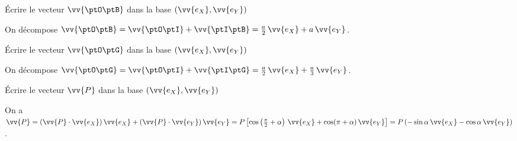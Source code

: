 \debutEntrainement


\begin{enonce}
	Écrire le vecteur $\vv{\ptO\ptB}$ dans la base $(\vv{e_X},\vv{e_Y})$
\end{enonce}


\begin{corrige}
	On décompose $\vv{\ptO\ptB} = \vv{\ptO\ptI} + \vv{\ptI\ptB} = \frac{a}{2}\,\vv{e_X} + a\,\vv{e_Y}$.
\end{corrige}



\begin{enonce}
	Écrire le vecteur $\vv{\ptO\ptG}$ dans la base $(\vv{e_X},\vv{e_Y})$
\end{enonce}


\begin{corrige}
	On décompose $\vv{\ptO\ptG} = \vv{\ptO\ptI} + \vv{\ptI\ptG} = \frac{a}{2}\,\vv{e_X} + \frac{a}{3}\,\vv{e_Y}$.
\end{corrige}



\begin{enonce}
	Écrire le vecteur $\vv{P}$ dans la base $(\vv{e_X},\vv{e_Y})$
\end{enonce}


\begin{corrige}
	On a $\vv{P} = (\vv{P}\cdot\vv{e_X})\,\vv{e_X}
		+ (\vv{P}\cdot\vv{e_Y})\,\vv{e_Y}
		= P\left[\cos\left(\frac\pi2 + \alpha\right)\,\vv{e_X} + \cos(\pi+\alpha)\,\vv{e_Y}\right]
		= P\left(-\sin\alpha\,\vv{e_X} -\cos\alpha\,\vv{e_Y}\right)$.
\end{corrige}

